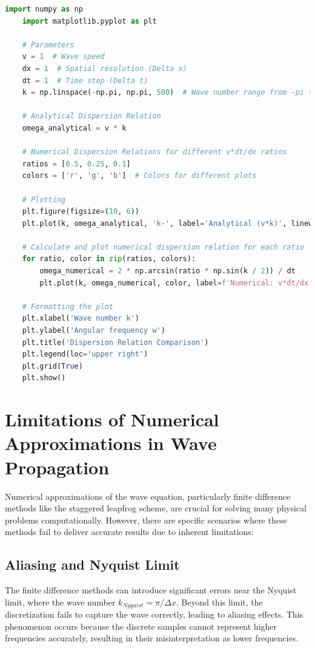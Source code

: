 \documentclass{article}
\begin{document}
\begin{lstlisting}[language=python]
    import numpy as np
    import matplotlib.pyplot as plt
    
    # Parameters
    v = 1  # Wave speed
    dx = 1  # Spatial resolution (Delta x)
    dt = 1  # Time step (Delta t)
    k = np.linspace(-np.pi, np.pi, 500)  # Wave number range from -pi to pi
    
    # Analytical Dispersion Relation
    omega_analytical = v * k
    
    # Numerical Dispersion Relations for different v*dt/dx ratios
    ratios = [0.5, 0.25, 0.1]
    colors = ['r', 'g', 'b']  # Colors for different plots
    
    # Plotting
    plt.figure(figsize=(10, 6))
    plt.plot(k, omega_analytical, 'k-', label='Analytical (v*k)', linewidth=2)
    
    # Calculate and plot numerical dispersion relation for each ratio
    for ratio, color in zip(ratios, colors):
        omega_numerical = 2 * np.arcsin(ratio * np.sin(k / 2)) / dt
        plt.plot(k, omega_numerical, color, label=f'Numerical: v*dt/dx = {ratio}', linewidth=2)
    
    # Formatting the plot
    plt.xlabel('Wave number k')
    plt.ylabel('Angular frequency w')
    plt.title('Dispersion Relation Comparison')
    plt.legend(loc='upper right')
    plt.grid(True)
    plt.show()        
\end{lstlisting}

\section{Limitations of Numerical Approximations in Wave Propagation}

Numerical approximations of the wave equation, particularly finite difference methods like the staggered leapfrog scheme, are crucial for solving many physical problems computationally. However, there are specific scenarios where these methods fail to deliver accurate results due to inherent limitations:

\subsection{Aliasing and Nyquist Limit}
The finite difference methods can introduce significant errors near the Nyquist limit, where the wave number \(k_{Nyquist} = \pi/\Delta x\). Beyond this limit, the discretization fails to capture the wave correctly, leading to aliasing effects. This phenomenon occurs because the discrete samples cannot represent higher frequencies accurately, resulting in their misinterpretation as lower frequencies.
\end{document}
